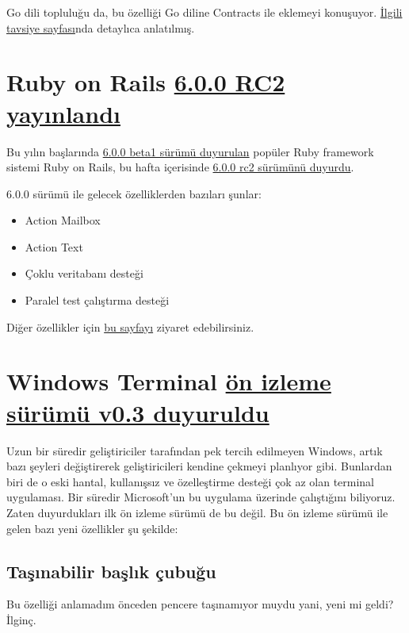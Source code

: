 \documentclass[11pt]{article}
\begin{document}
Go dili topluluğu da, bu özelliği Go diline Contracts ile eklemeyi konuşuyor.
\href{https://go.googlesource.com/proposal/+/master/design/go2draft-contracts.md}{İlgili tavsiye sayfası}nda detaylıca anlatılmış.
\section{Ruby on Rails \href{https://weblog.rubyonrails.org/2019/7/30/Rails-6-0-rc2-released/}{6.0.0 RC2 yayınlandı}}
\label{sec:orga84f1ee}
Bu yılın başlarında \href{https://weblog.rubyonrails.org/2019/1/18/Rails-6-0-Action-Mailbox-Action-Text-Multiple-DBs-Parallel-Testing/}{6.0.0 beta1 sürümü duyurulan} popüler Ruby framework
sistemi Ruby on Rails, bu hafta içerisinde \href{https://weblog.rubyonrails.org/2019/7/30/Rails-6-0-rc2-released/}{6.0.0 rc2 sürümünü duyurdu}.

6.0.0 sürümü ile gelecek özelliklerden bazıları şunlar:
\begin{itemize}
\item Action Mailbox
\item Action Text
\item Çoklu veritabanı desteği
\item Paralel test çalıştırma desteği
\end{itemize}

Diğer özellikler için \href{https://weblog.rubyonrails.org/2019/1/18/Rails-6-0-Action-Mailbox-Action-Text-Multiple-DBs-Parallel-Testing/}{bu sayfayı} ziyaret edebilirsiniz.
\section{Windows Terminal \href{https://devblogs.microsoft.com/commandline/windows-terminal-preview-v0-3-release/?WT.mc\_id=social-reddit-marouill}{ön izleme sürümü v0.3 duyuruldu}}
\label{sec:org4c96ec9}
Uzun bir süredir geliştiriciler tarafından pek tercih edilmeyen Windows, artık
bazı şeyleri değiştirerek geliştiricileri kendine çekmeyi planlıyor gibi.
Bunlardan biri de o eski hantal, kullanışsız ve özelleştirme desteği çok az
olan terminal uygulaması. Bir süredir Microsoft'un bu uygulama üzerinde
çalıştığını biliyoruz. Zaten duyurdukları ilk ön izleme sürümü de bu değil.
Bu ön izleme sürümü ile gelen bazı yeni özellikler şu şekilde:

\subsection{Taşınabilir başlık çubuğu}
\label{sec:orgdd3ad4e}
Bu özelliği anlamadım önceden pencere taşınamıyor muydu yani, yeni mi geldi?
İlginç.
\end{document}
